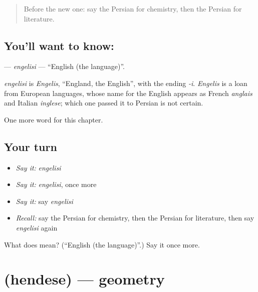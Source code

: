 \label{lesson:FA-C285-engelisi}



\begin{quote}
Before the new one: say the Persian for chemistry, then the Persian for literature.
\end{quote}

\subsection*{You'll want to know: }
\textbf{} — \emph{engelisi} — \textquotedblleft{}English (the language)\textquotedblright{}.

\begin{cousinweb}
\emph{engelisi} is \emph{Engelis}, \textquotedblleft{}England, the English\textquotedblright{}, with the ending \emph{-i}. \emph{Engelis} is a loan from European languages, whose name for the English appears as French \emph{anglais} and Italian \emph{inglese}; which one passed it to Persian is not certain.
\end{cousinweb}

\begin{grammarlens}[title={What you've built}]
One more word for this chapter.
\end{grammarlens}

\subsection*{Your turn}
\begin{itemize}
\raggedright
  \item \emph{Say it:} \emph{engelisi}
  \item \emph{Say it:} \emph{engelisi}, once more
  \item \emph{Say it:} say \emph{engelisi}
  \item \emph{Recall:} say the Persian for chemistry, then the Persian for literature, then say \emph{engelisi} again
\end{itemize}

\begin{tcolorbox}[breakable,colback=teal!4,colframe=teal!35!black,title={Before you move on}]
What does  mean? (\textquotedblleft{}English (the language)\textquotedblright{}.) Say it once more.
\end{tcolorbox}
\section[\texorpdfstring{\fa{هندسه} (hendese)}{هندسه (hendese)}]{ (hendese) — geometry}

